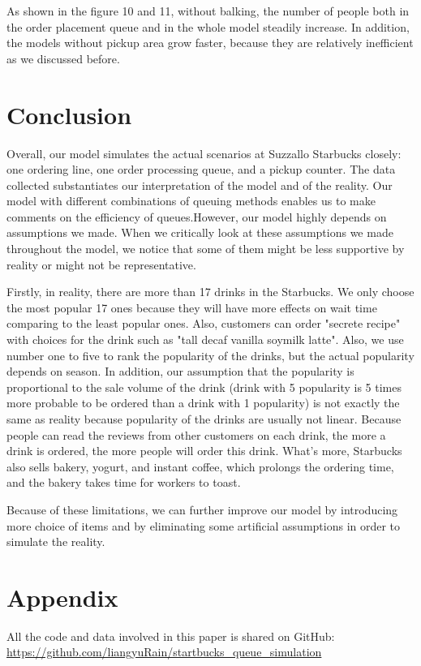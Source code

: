 \documentclass[a4paper]{article}
\begin{document}
As shown in the figure 10 and 11, without balking, the number of people both in the order placement queue and in the whole model steadily increase. In addition, the models without pickup area grow faster, because they are relatively inefficient as we discussed before.

\section{Conclusion}
Overall, our model simulates the actual scenarios at Suzzallo Starbucks closely: one ordering line, one order processing queue, and a pickup counter. The data collected substantiates our interpretation of the model and of the reality. Our model with different combinations of queuing methods enables us to make comments on the efficiency of queues.However, our model highly depends on assumptions we made. When we critically look at these assumptions we made throughout the model, we notice that some of them might be less supportive by reality or might not be representative. 

Firstly, in reality, there are more than 17 drinks in the Starbucks. We only choose the most popular 17 ones because they will have more effects on wait time comparing to the least popular ones. Also, customers can order "secrete recipe" with choices for the drink such as "tall decaf vanilla soymilk latte". Also, we use number one to five to rank the popularity of the drinks, but the actual popularity depends on season. In addition, our assumption that the popularity is proportional to the sale volume of the drink (drink with 5 popularity is 5 times more probable to be ordered than a drink with 1 popularity) is not exactly the same as reality because popularity of the drinks are usually not linear. Because people can read the reviews from other customers on each drink, the more a drink is ordered, the more people will order this drink. What's more, Starbucks also sells bakery, yogurt, and instant coffee, which prolongs the ordering time, and the bakery takes time for workers to toast.

Because of these limitations, we can further improve our model by introducing more choice of items and by eliminating some artificial assumptions in order to simulate the reality.

\newpage

\section*{Appendix}
All the code and data involved in this paper is shared on GitHub: \\
\url{https://github.com/liangyuRain/startbucks_queue_simulation} \\ \\
\end{document}
